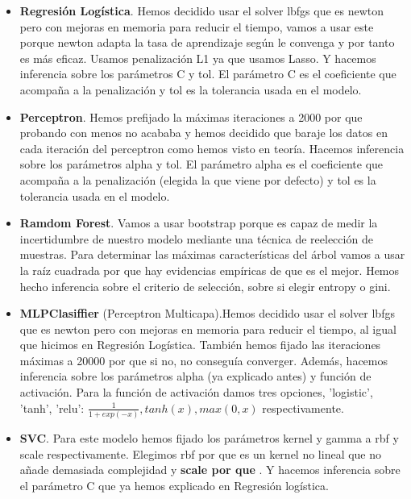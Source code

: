 \documentclass[a4paper,11pt]{article}
\begin{document}
\begin{itemize}

\item \textbf{Regresión Logística}. Hemos decidido usar el solver lbfgs que es
newton pero con mejoras en memoria para reducir el tiempo, vamos a usar este
porque newton adapta la tasa de aprendizaje según le convenga y por tanto es más
eficaz. Usamos penalización L1 ya que usamos Lasso. Y hacemos inferencia sobre
los parámetros C y tol. El parámetro C es el coeficiente que acompaña a la
penalización y tol es la tolerancia usada en el modelo.

\item \textbf{Perceptron}. Hemos prefijado la máximas iteraciones a 2000 por que
probando con menos no acababa y hemos decidido que baraje los datos en cada
iteración del perceptron como hemos visto en teoría. Hacemos inferencia sobre
los parámetros alpha y tol. El parámetro alpha es el coeficiente que acompaña a
la penalización (elegida la que viene por defecto) y tol es la tolerancia usada
en el modelo.

\item \textbf{Ramdom Forest}. Vamos a usar bootstrap porque es capaz de medir la
incertidumbre de nuestro modelo mediante una técnica de reelección de muestras.
Para determinar las máximas características del árbol vamos a usar la raíz
cuadrada por que hay evidencias empíricas de que es el mejor. Hemos hecho
inferencia sobre el criterio de selección, sobre si elegir entropy o gini. 

\item \textbf{MLPClasiffier} (Perceptron Multicapa).Hemos decidido usar el
solver lbfgs que es newton pero con mejoras en memoria para reducir el tiempo,
al igual que hicimos en Regresión Logística. También hemos fijado las
iteraciones máximas a 20000 por que si no, no conseguía converger. Además,
hacemos inferencia sobre los parámetros alpha (ya explicado antes) y función de
activación. Para la función de activación damos tres opciones, 'logistic',
'tanh', 'relu': $ \frac{1}{1 + exp(-x)} , tanh(x), max(0, x)$ respectivamente.

\item \textbf{SVC}. Para este modelo hemos fijado los parámetros kernel y gamma
a rbf y scale respectivamente. Elegimos rbf por que es un kernel no lineal que
no añade demasiada complejidad y \textbf{ scale por que }. Y hacemos inferencia
sobre el parámetro C que ya hemos explicado en Regresión logística.

\end{itemize}
\end{document}
